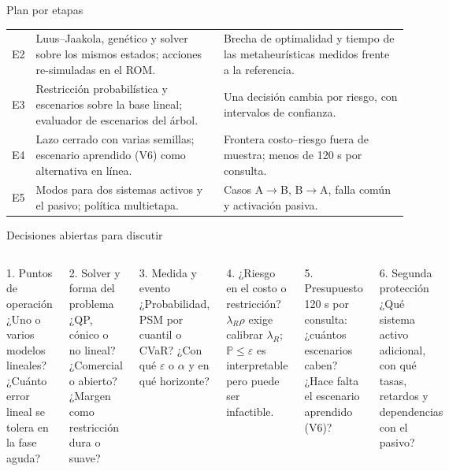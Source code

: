 \documentclass[aspectratio=169,10pt]{beamer}
\newcommand{\Prob}{\mathbb P}
\begin{document}
\begin{frame}{Plan por etapas}
\begin{tabular}{@{}L{.6cm}L{6.4cm}L{6.4cm}@{}}
E2 & Luus--Jaakola, genético y solver sobre los mismos estados; acciones re-simuladas en el ROM. & Brecha de optimalidad y tiempo de las metaheurísticas medidos frente a la referencia.\\
E3 & Restricción probabilística y escenarios sobre la base lineal; evaluador de escenarios del árbol. & Una decisión cambia por riesgo, con intervalos de confianza.\\
E4 & Lazo cerrado con varias semillas; escenario aprendido (V6) como alternativa en línea. & Frontera costo--riesgo fuera de muestra; menos de 120 s por consulta.\\
E5 & Modos para dos sistemas activos y el pasivo; política multietapa. & Casos A$\to$B, B$\to$A, falla común y activación pasiva.\\
\bottomrule
\end{tabular}
\end{frame}

\begin{frame}{Decisiones abiertas para discutir}
\begin{columns}[T]
\small
\begin{block}{1. Puntos de operación}
¿Uno o varios modelos lineales? ¿Cuánto error lineal se tolera en la fase aguda?
\end{block}
\begin{block}{2. Solver y forma del problema}
¿QP, cónico o no lineal? ¿Comercial o abierto? ¿Margen como restricción dura o suave?
\end{block}
\begin{block}{3. Medida y evento}
¿Probabilidad, PSM por cuantil o CVaR? ¿Con qué $\varepsilon$ o $\alpha$ y en qué horizonte?
\end{block}
\small
\begin{block}{4. ¿Riesgo en el costo o restricción?}
$\lambda_R\rho$ exige calibrar $\lambda_R$; $\Prob\leq\varepsilon$ es interpretable pero puede ser infactible.
\end{block}
\begin{block}{5. Presupuesto}
120 s por consulta: ¿cuántos escenarios caben? ¿Hace falta el escenario aprendido (V6)?
\end{block}
\begin{block}{6. Segunda protección}
¿Qué sistema activo adicional, con qué tasas, retardos y dependencias con el pasivo?
\end{block}
\end{columns}
\end{frame}
\end{document}
